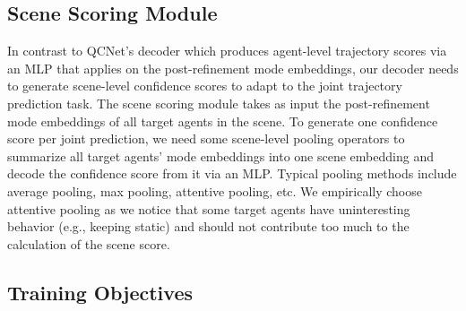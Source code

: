\documentclass[10pt,twocolumn,letterpaper]{article}
\begin{document}
\subsection{Scene Scoring Module}

In contrast to QCNet's decoder which produces agent-level trajectory scores via an MLP that applies on the post-refinement mode embeddings, our decoder needs to generate scene-level confidence scores to adapt to the joint trajectory prediction task. The scene scoring module takes as input the post-refinement mode embeddings of all target agents in the scene. To generate one confidence score per joint prediction, we need some scene-level pooling operators to summarize all target agents' mode embeddings into one scene embedding and decode the confidence score from it via an MLP. Typical pooling methods include average pooling, max pooling, attentive pooling, etc. We empirically choose attentive pooling as we notice that some target agents have uninteresting behavior (e.g., keeping static) and should not contribute too much to the calculation of the scene score.

\subsection{Training Objectives}
\end{document}
